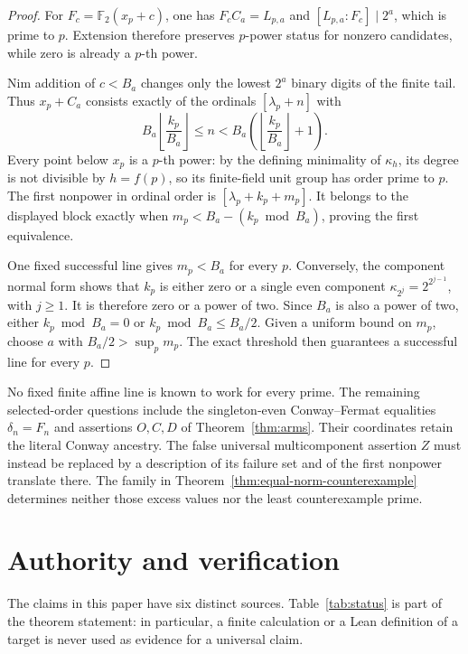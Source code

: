 \documentclass[11pt]{article}
\theoremstyle{definition}
\theoremstyle{remark}
\begin{document}
\begin{proof}
For $F_c=\mathbb F_2(x_p+c)$, one has $F_cC_a=L_{p,a}$ and
$[L_{p,a}:F_c]\mid2^a$, which is prime to $p$.  Extension therefore
preserves $p$-power status for nonzero candidates, while zero is already a
$p$-th power.

Nim addition of $c<B_a$ changes only the lowest $2^a$ binary digits of the
finite tail.  Thus $x_p+C_a$ consists exactly of the ordinals
$[\lambda_p+n]$ with
\[
 B_a\left\lfloor\frac{k_p}{B_a}\right\rfloor
 \leq n<
 B_a\left(\left\lfloor\frac{k_p}{B_a}\right\rfloor+1\right).
\]
Every point below $x_p$ is a $p$-th power: by the defining minimality of
$\kappa_h$, its degree is not divisible by $h=f(p)$, so its finite-field
unit group has order prime to $p$.  The first nonpower in ordinal order is
$[\lambda_p+k_p+m_p]$.  It belongs to the displayed block exactly when
$m_p<B_a-(k_p\bmod B_a)$, proving the first equivalence.

One fixed successful line gives $m_p<B_a$ for every $p$.  Conversely, the
component normal form shows that $k_p$ is either zero or a single even
component $\kappa_{2^j}=2^{2^{j-1}}$, with $j\geq1$.  It is therefore zero
or a power of two.  Since $B_a$ is also a power of two, either
$k_p\bmod B_a=0$ or $k_p\bmod B_a\leq B_a/2$.  Given a uniform bound on
$m_p$, choose $a$ with $B_a/2>\sup_p m_p$.  The exact threshold then
guarantees a successful line for every $p$.
\end{proof}

No fixed finite affine line is known to work for every prime.  The remaining
selected-order questions include the singleton-even Conway--Fermat equalities
$\delta_n=F_n$ and assertions $O,C,D$ of Theorem~\ref{thm:arms}.  Their
coordinates retain the literal Conway ancestry.  The false universal
multicomponent assertion $Z$ must instead be replaced by a description of its
failure set and of the first nonpower translate there.  The family in
Theorem~\ref{thm:equal-norm-counterexample} determines neither those excess
values nor the least counterexample prime.

\section{Authority and verification}\label{sec:verification}

The claims in this paper have six distinct sources.  Table~\ref{tab:status}
is part of the theorem statement: in particular, a finite calculation or a
Lean definition of a target is never used as evidence for a universal claim.
\end{document}

